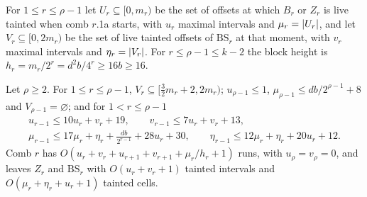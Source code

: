For $1\le r\le\rho-1$ let $U_r\subseteq[0,m_r)$ be the set of offsets at which $B_r$ or $Z_r$ is live tainted when comb $r$.1a starts,
with $u_r$ maximal intervals and $\mu_r=\lvert U_r \rvert$, and let $V_r\subseteq[0,2m_r)$ be the set of live tainted offsets of $\mathrm{BS}_r$
at that moment, with $v_r$ maximal intervals and $\eta_r=\lvert V_r \rvert$. For $r\le\rho-1\le k-2$ the block height is
$h_r=m_r/2^r=d^2b/4^r\ge16b\ge16$.

\begin{lemma}\label{lem:c4-backward}
\notformalized
Let $\rho\ge2$. For $1\le r\le\rho-1$, $V_r\subseteq[\frac32m_r+2,2m_r)$; $u_{\rho-1}\le1$, $\mu_{\rho-1}\le db/2^{\rho-1}+8$ and
$V_{\rho-1}=\varnothing$; and for $1<r\le\rho-1$
\begin{gather*}
  u_{r-1}\le10u_r+v_r+19,\qquad v_{r-1}\le7u_r+v_r+13,\\
  \mu_{r-1}\le17\mu_r+\eta_r+\frac{db}{2^{r-1}}+28u_r+30,\qquad \eta_{r-1}\le12\mu_r+\eta_r+20u_r+12 .
\end{gather*}
Comb $r$ has $O(u_r+v_r+u_{r+1}+v_{r+1}+\mu_r/h_r+1)$ runs, with $u_\rho=v_\rho=0$, and leaves $Z_r$ and $\mathrm{BS}_r$ with
$O(u_r+v_r+1)$ tainted intervals and $O(\mu_r+\eta_r+u_r+1)$ tainted cells.
\end{lemma}

